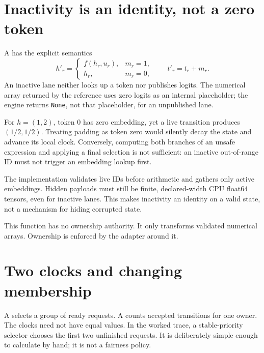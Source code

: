 \section{Inactivity is an identity, not a zero token}
\label{evod34:mask}
A  has the explicit semantics
\[
 h'_r=
 \begin{cases}f(h_r,u_r),&m_r=1,\\h_r,&m_r=0,\end{cases}
 \qquad t'_r=t_r+m_r.
\]
An inactive lane neither looks up a token nor publishes logits. The numerical
array returned by the reference uses zero logits as an internal placeholder;
the engine returns \texttt{None}, not that placeholder, for an unpublished
lane.


For $h=(1,2)$, token $0$ has zero embedding, yet a live transition produces
$(1/2,1/2)$. Treating padding as token zero would silently decay the state and
advance its local clock. Conversely, computing both branches of an unsafe
expression and applying a final selection is not sufficient: an inactive
out-of-range ID must not trigger an embedding lookup first.

The implementation validates live IDs before arithmetic and gathers only
active embeddings. Hidden payloads must still be finite, declared-width CPU
float64 tensors, even for inactive lanes. This makes inactivity an identity
on a valid state, not a mechanism for hiding corrupted state.


This function has no ownership authority. It only transforms validated
numerical arrays. Ownership is enforced by the adapter around it.

\section{Two clocks and changing membership}
\label{evod34:clocks}
A  selects a group of ready requests. A
 counts accepted transitions for one owner.
The clocks need not have equal values. In the worked trace, a stable-priority
selector chooses the first two unfinished requests. It is deliberately simple
enough to calculate by hand; it is not a fairness policy.


